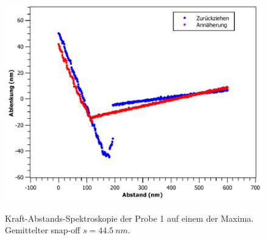 \documentclass[
	a4paper,
	12pt,
	pagesize,
	ngerman
]{scrartcl}
\begin{document}
\begin{figure}[H]
{			\label{fig_dvd_ds5}}{\includegraphics[width=.49\linewidth]{images/DVD/DS5}}
			\caption{Kraft-Abstands-Spektroskopie der Probe 1 auf einem der Maxima. Gemittelter snap-off $s=\SI{44.5}{nm}$.} %
			\label{fig_dvd_ds}
\end{figure}

\begin{figure}[H]

\end{figure}
\end{document}
